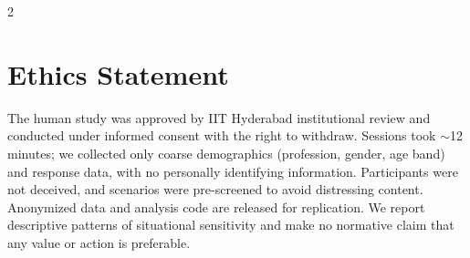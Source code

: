 \documentclass[11pt]{article}
\begin{document}
\begin{multicols}{2}



\section{Ethics Statement}
\label{sec:ethics}

The human study was approved by IIT Hyderabad institutional review and conducted under informed consent with the right to withdraw. Sessions took $\sim$12 minutes; we collected only coarse demographics (profession, gender, age band) and response data, with no personally identifying information. Participants were not deceived, and scenarios were pre-screened to avoid distressing content. Anonymized data and analysis code are released for replication. We report descriptive patterns of situational sensitivity and make no normative claim that any value or action is preferable.




\end{multicols}

\clearpage
\appendix
\end{document}
